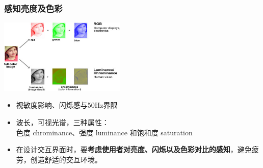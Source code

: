 \documentclass{beamer}
\begin{document}
\begin{frame}
	\frametitle{感知亮度及色彩}
	\beamertemplatetransparentcovereddynamicmedium
	\begin{center}
		\includegraphics[width=6cm]{images/04_rgb_luminance.jpg}
	\end{center}
	\begin{itemize}[<+->]
		\item 视敏度影响、闪烁感与50Hz界限
		\item 波长，可视光谱，三种属性：\\{\tiny 色度 chrominance、强度 luminance 和饱和度 saturation}
		\item 在设计交互界面时，要\textbf{考虑使用者对亮度、闪烁以及色彩对比的感知}，避免疲劳，创造舒适的交互环境。
	\end{itemize}
\end{frame}
\end{document}
